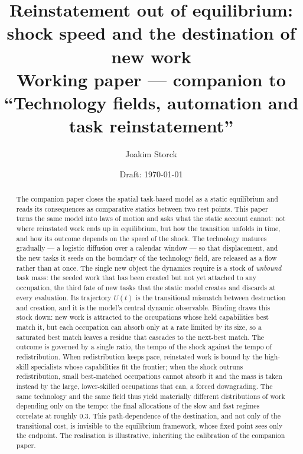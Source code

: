 \documentclass[12pt, a4paper]{article}
\title{Reinstatement out of equilibrium: shock speed and the destination of new work\\
\large Working paper --- companion to ``Technology fields, automation and task reinstatement''}
\author{Joakim Storck}
\date{Draft: \today}
\begin{document}
\maketitle

\begin{abstract}
\noindent
The companion paper closes the spatial task-based model as a static
equilibrium and reads its consequences as comparative statics between
two rest points. This paper turns the same model into laws of motion and
asks what the static account cannot: not where reinstated work ends up in
equilibrium, but how the transition unfolds in time, and how its outcome
depends on the speed of the shock. The technology matures gradually --- a
logistic diffusion over a calendar window --- so that displacement, and
the new tasks it seeds on the boundary of the technology field, are
released as a flow rather than at once. The single new object the
dynamics require is a stock of \emph{unbound} task mass: the seeded work
that has been created but not yet attached to any occupation, the third
fate of new tasks that the static model creates and discards at every
evaluation. Its trajectory $U(t)$ is the transitional mismatch between
destruction and creation, and it is the model's central dynamic
observable. Binding draws this stock down: new work is attracted to the
occupations whose held capabilities best match it, but each occupation
can absorb only at a rate limited by its size, so a saturated best match
leaves a residue that cascades to the next-best match. The outcome is
governed by a single ratio, the tempo of the shock against the tempo of
redistribution. When redistribution keeps pace, reinstated work is bound
by the high-skill specialists whose capabilities fit the frontier; when
the shock outruns redistribution, small best-matched occupations cannot
absorb it and the mass is taken instead by the large, lower-skilled
occupations that can, a forced downgrading. The same technology and the
same field thus yield materially different distributions of work
depending only on the tempo: the final allocations of the slow and fast
regimes correlate at roughly $0.3$. This path-dependence of the
destination, and not only of the transitional cost, is invisible to the
equilibrium framework, whose fixed point sees only the endpoint. The
realisation is illustrative, inheriting the calibration of the companion
paper.
\end{abstract}

\tableofcontents
\newpage

\end{document}
